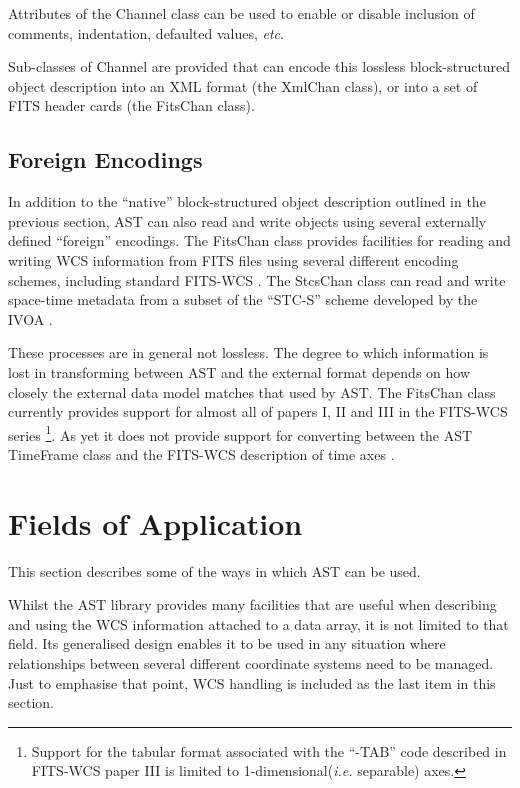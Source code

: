 \documentclass[final,authoryear,5p,times,twocolumn]{elsarticle}
\begin{document}
Attributes of the Channel class can be used to enable or disable
inclusion of comments, indentation, defaulted values, \emph{etc}.

Sub-classes of Channel are provided that can encode this lossless
block-structured object description into an XML format (the XmlChan
class), or into a set of FITS header cards (the FitsChan class).

\subsection{Foreign Encodings}

In addition to the ``native'' block-structured object description
outlined in the previous section, AST can also read and write objects
using several externally defined ``foreign'' encodings. The FitsChan
class provides facilities for reading and writing WCS information from
FITS files using several different encoding schemes, including standard
FITS-WCS \citep[FITS;][]{1995ASPC...77..233G}. The StcsChan
class can read and write space-time metadata from a subset of the
``STC-S'' scheme developed by the IVOA \citep{STC}.

These processes are in general not lossless. The degree to which
information is lost in transforming between AST and the external format
depends on how closely the external data model matches that used by AST.
The FitsChan class currently provides support for almost all of papers I,
II and III in the FITS-WCS series \citep{FITSWCSI,FITSWCSII,FITSWCSIII}
\footnote{Support for the tabular format associated with the ``-TAB'' code
described in FITS-WCS paper III is limited to 1-dimensional(\emph{i.e.}
separable) axes.}. As yet it does not provide support for converting
between the AST TimeFrame class and the FITS-WCS description of time
axes \citep{FITSWCSIV}.

\section{Fields of Application}
This section describes some of the ways in which AST can be used.

Whilst the AST library provides many facilities that are useful when
describing and using the WCS information attached to a data array, it
is not limited to that field. Its generalised design enables it to be used
in any situation where relationships between several different coordinate
systems need to be managed. Just to emphasise that point, WCS handling is
included as the last item in this section.
\end{document}
